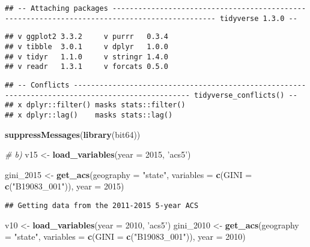 \documentclass[
]{article}
\newenvironment{Shaded}{\begin{snugshade}}{\end{snugshade}}
\newcommand{\CommentTok}[1]{\textcolor[rgb]{0.56,0.35,0.01}{\textit{#1}}}
\newcommand{\DataTypeTok}[1]{\textcolor[rgb]{0.13,0.29,0.53}{#1}}
\newcommand{\DecValTok}[1]{\textcolor[rgb]{0.00,0.00,0.81}{#1}}
\newcommand{\KeywordTok}[1]{\textcolor[rgb]{0.13,0.29,0.53}{\textbf{#1}}}
\newcommand{\NormalTok}[1]{#1}
\newcommand{\StringTok}[1]{\textcolor[rgb]{0.31,0.60,0.02}{#1}}
\begin{document}
\begin{verbatim}
## -- Attaching packages ---------------------------------------------------------------------------------------------- tidyverse 1.3.0 --
\end{verbatim}

\begin{verbatim}
## v ggplot2 3.3.2     v purrr   0.3.4
## v tibble  3.0.1     v dplyr   1.0.0
## v tidyr   1.1.0     v stringr 1.4.0
## v readr   1.3.1     v forcats 0.5.0
\end{verbatim}

\begin{verbatim}
## -- Conflicts ------------------------------------------------------------------------------------------------- tidyverse_conflicts() --
## x dplyr::filter() masks stats::filter()
## x dplyr::lag()    masks stats::lag()
\end{verbatim}

\begin{Shaded}
\begin{Highlighting}[]
\KeywordTok{suppressMessages}\NormalTok{(}\KeywordTok{library}\NormalTok{(bit64))}


\CommentTok{# b)}
\NormalTok{v15 <-}\StringTok{ }\KeywordTok{load_variables}\NormalTok{(}\DataTypeTok{year =} \DecValTok{2015}\NormalTok{,}
                      \StringTok{'acs5'}\NormalTok{)}


\NormalTok{gini_}\DecValTok{2015}\NormalTok{ <-}\StringTok{ }\KeywordTok{get_acs}\NormalTok{(}\DataTypeTok{geography =} \StringTok{"state"}\NormalTok{,}
                 \DataTypeTok{variables =} \KeywordTok{c}\NormalTok{(}\DataTypeTok{GINI =} \KeywordTok{c}\NormalTok{(}\StringTok{"B19083_001"}\NormalTok{)),}
                 \DataTypeTok{year =} \DecValTok{2015}\NormalTok{)}
\end{Highlighting}
\end{Shaded}

\begin{verbatim}
## Getting data from the 2011-2015 5-year ACS
\end{verbatim}

\begin{Shaded}
\begin{Highlighting}[]
\NormalTok{v10 <-}\StringTok{ }\KeywordTok{load_variables}\NormalTok{(}\DataTypeTok{year =} \DecValTok{2010}\NormalTok{,}
                      \StringTok{'acs5'}\NormalTok{)}
\NormalTok{gini_}\DecValTok{2010}\NormalTok{ <-}\StringTok{ }\KeywordTok{get_acs}\NormalTok{(}\DataTypeTok{geography =} \StringTok{"state"}\NormalTok{,}
                        \DataTypeTok{variables =} \KeywordTok{c}\NormalTok{(}\DataTypeTok{GINI =} \KeywordTok{c}\NormalTok{(}\StringTok{"B19083_001"}\NormalTok{)), }\DataTypeTok{year =} \DecValTok{2010}\NormalTok{)}
\end{Highlighting}
\end{Shaded}
\end{document}
